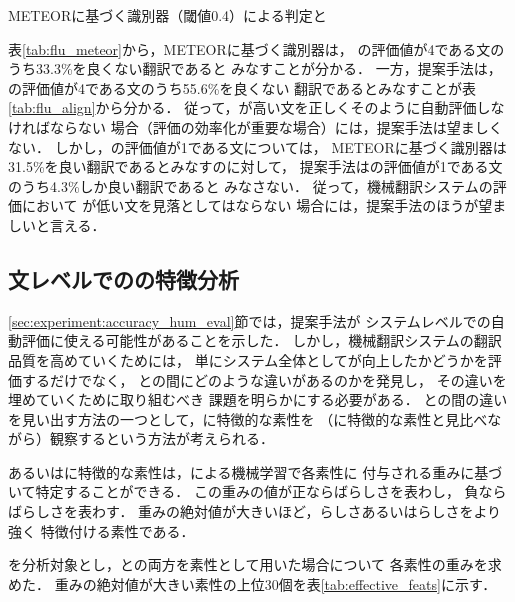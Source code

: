 \documentclass[japanese]{jnlp_1.4}
\newcommand{\AL}{}
\newcommand{\NAL}{}
\newcommand{\FLU}{}
\newcommand{\HUM}{}
\newcommand{\MT}{}
\newcommand{\SVM}{}
\newcommand{\MTS}{}
\begin{document}
\begin{table}[b]
\caption{METEORに基づく識別器（閾値0.4）による判定と{\FLU}}
\label{tab:flu_meteor}

\end{table}

表\ref{tab:flu_meteor}から，METEORに基づく識別器は，
{\FLU}の評価値が4である文のうち33.3\%を良くない翻訳であると
みなすことが分かる．
一方，提案手法は，{\FLU}の評価値が4である文のうち55.6\%を良くない
翻訳であるとみなすことが表\ref{tab:flu_align}から分かる．
従って，{\FLU}が高い文を正しくそのように自動評価しなければならない
場合（評価の効率化が重要な場合）には，提案手法は望ましくない．
しかし，{\FLU}の評価値が1である文については，
METEORに基づく識別器は31.5\%を良い翻訳であるとみなすのに対して，
提案手法は{\FLU}の評価値が1である文のうち4.3\%しか良い翻訳であると
みなさない．
従って，機械翻訳システムの評価において
{\FLU}が低い文を見落としてはならない
場合には，提案手法のほうが望ましいと言える．


\subsection{文レベルでの{\MT}の特徴分析}
\label{sec:experiment:likeness}


\ref{sec:experiment:accuracy_hum_eval}節では，提案手法が
システムレベルでの自動評価に使える可能性があることを示した．
しかし，機械翻訳システムの翻訳品質を高めていくためには，
単にシステム全体として{\FLU}が向上したかどうかを評価するだけでなく，
{\MT}と{\HUM}の間にどのような違いがあるのかを発見し，
その違いを埋めていくために取り組むべき 課題を明らかにする必要がある．
{\MT}と{\HUM}の間の違いを見い出す方法の一つとして，{\MT}に特徴的な素性を
（{\HUM}に特徴的な素性と見比べながら）観察するという方法が考えられる．

{\MT}あるいは{\HUM}に特徴的な素性は，{\SVM}による機械学習で各素性に
付与される重みに基づいて特定することができる．
この重みの値が正ならば{\HUM}らしさを表わし，
負ならば{\MT}らしさを表わす．
重みの絶対値が大きいほど，{\HUM}らしさあるいは{\MT}らしさをより強く
特徴付ける素性である．

{\MTS}を分析対象とし，{\AL}と{\NAL}の両方を素性として用いた場合について
各素性の重みを求めた．
重みの絶対値が大きい素性の上位30個を表\ref{tab:effective_feats}に示す．
\end{document}
